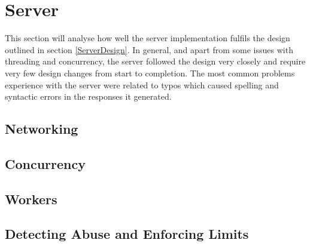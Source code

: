 \section{Server}

This section will analyse how well the server implementation fulfils the design outlined in section \ref{ServerDesign}. In general, and apart from some issues with threading and concurrency, the server followed the design very closely and require very few design changes from start to completion. The most common problems experience with the server were related to typos which caused spelling and syntactic errors in the responses it generated.

\subsection{Networking}


\subsection{Concurrency}

\subsection{Workers}

\subsection{Detecting Abuse and Enforcing Limits}

